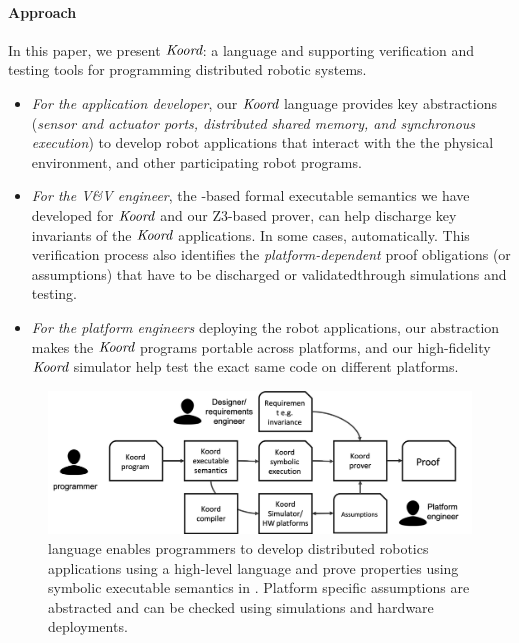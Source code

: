 \paragraph{Approach} In this paper, we present $\emph{Koord}$: a language and supporting verification and testing tools for programming distributed robotic systems. 
\begin{itemize}
\item {\em For the application developer}, our $\emph{Koord}$ language provides key abstractions (\emph{sensor and actuator ports, distributed shared memory, and synchronous execution}) to develop robot applications that interact with the the physical environment, and other participating robot programs.
\item {\em For the V\&V engineer}, the \K-based formal executable semantics we have developed for $\emph{Koord}$ and our Z3-based prover, can help discharge key invariants of the $\emph{Koord}$ applications.  In some cases,  automatically. This verification process also identifies the {\em platform-dependent\/} proof obligations (or assumptions) that have to be discharged or validatedthrough simulations and testing. 
\item {\em For the platform engineers\/} deploying the robot applications, our abstraction makes the $\emph{Koord}$ programs portable across platforms, and our high-fidelity $\emph{Koord}$ simulator help test the exact same code on different platforms.
\end{itemize}

\begin{figure}[h!]
\includegraphics[width=\linewidth]{figs/koorduser.png}
\caption{\small \lgname language  enables programmers to develop distributed robotics applications using a high-level language and prove properties using symbolic executable semantics in \K. Platform specific assumptions are abstracted and can be checked using simulations and hardware deployments.}
\label{fig:koorduser}
	\vspace{-5mm}
\end{figure}

